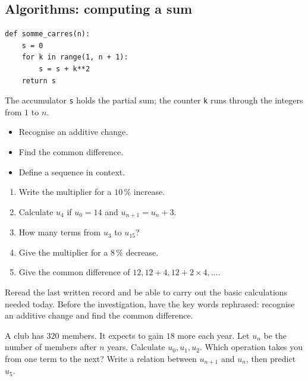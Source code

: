 \subsection{Algorithms: computing a sum}
\begin{lstlisting}[style=python]
def somme_carres(n):
    s = 0
    for k in range(1, n + 1):
        s = s + k**2
    return s
\end{lstlisting}
The accumulator \texttt{s} holds the partial sum; the counter \texttt{k} runs through the integers from $1$ to $n$.

    \begin{objectifs}\begin{itemize}\item Recognise an additive change.\item Find the common difference.\item Define a sequence in context.\end{itemize}\end{objectifs}
    \begin{automatismes}\begin{enumerate}\item Write the multiplier for a $10\,\%$ increase. \item Calculate $u_4$ if $u_0=14$ and $u_{n+1}=u_n+3$. \item How many terms from $u_3$ to $u_{15}$? \item Give the multiplier for a $8\,\%$ decrease. \item Give the common difference of $12,12+4,12+2\times4,\ldots$. \end{enumerate}\end{automatismes}
    \begin{prerequis}Reread the last written record and be able to carry out the basic calculations needed today. Before the investigation, have the key words rephrased: recognise an additive change and find the common difference.\end{prerequis}

    \begin{activite}
    A club has $320$ members. It expects to gain $18$ more each year. Let $u_n$ be the number of members after $n$ years. Calculate $u_0,u_1,u_2$. Which operation takes you from one term to the next? Write a relation between $u_{n+1}$ and $u_n$, then predict $u_5$.
    \begin{center}\end{center}
    \end{activite}

